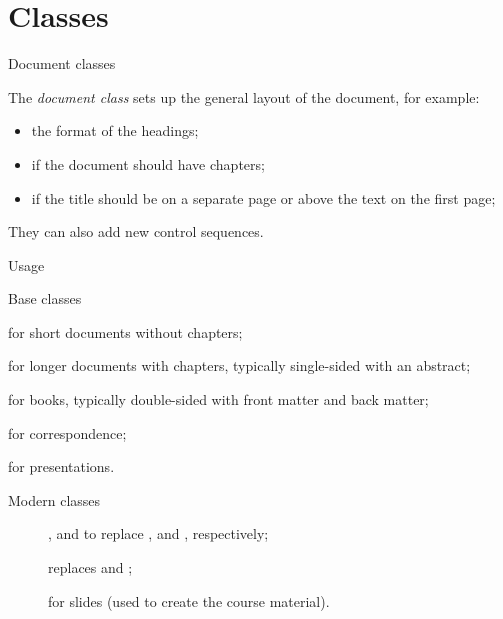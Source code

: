 \section{Classes}

\begin{frame}{Document classes}

  The \emph{document class} sets up the general layout of the document,
  for example:
   \begin{itemize}
     \item the format of the headings;
     \item if the document should have chapters;
     \item if the title should be on a separate page or above 
       the text on the first page;
   \end{itemize}
   They can also add new control sequences.

  \begin{block}{Usage}
  \end{block}
\end{frame}

\begin{frame}{Base classes}

  \begin{description}
    \item[] for short documents without chapters;
    \item[] for longer documents with chapters,
      typically single-sided with an abstract;
    \item[] for books, typically double-sided with
      front matter and back matter;
    \item<2->[\cls{letter}] for correspondence;
    \item<2->[\cls{slides}] for presentations.
  \end{description}

\end{frame}

\begin{frame}{Modern classes}

  \begin{description}
    \item[] , 
      and  to replace , 
      and , respectively;
    \item[] replaces  and ;
    \item[] for slides (used to create the course 
      material).
  \end{description}
  
\end{frame}

